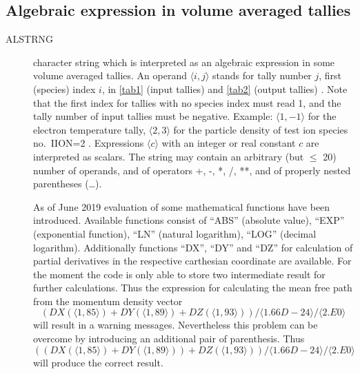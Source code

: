 \subsection{Algebraic expression in volume averaged tallies}\label{sec2.10C}

\begin{description}
  \item[ALSTRNG] character string which is interpreted as an
        algebraic expression in some volume averaged tallies.
        An operand $\langle i,j \rangle$ stands for tally number $j$, first (species)
        index $i$, in \cref{tab1} (input tallies) and \cref{tab2} (output tallies) .
        Note that the first index for tallies with no species index must read 1, and
        the tally number of input tallies must be negative.
        Example: $\langle 1,-1\rangle$ for the electron temperature tally, $\langle
          2,3\rangle$ for the particle density of test ion species no.\ IION=2 .
        Expressions $\langle c\rangle$ with an integer or real constant $c$ are
        interpreted as scalars.
        The string may contain an arbitrary (but $\le$ 20) number of operands, and of
        operators +, -, *, /, **, and of properly nested parentheses (\dots).

        As of June 2019 evaluation of some mathematical functions have been introduced.
        Available functions consist of ``ABS'' (absolute value), ``EXP'' (exponential
        function), ``LN'' (natural logarithm), ``LOG'' (decimal logarithm).
        Additionally functions ``DX'', ``DY'' and ``DZ'' for calculation of partial 
        derivatives in the respective carthesian coordinate are available. 
        For the moment the code is only able to store two intermediate result for 
        further calculations.
        Thus the expression for calculating the mean free path from the momentum 
        density vector 
        \begin{equation*}
          (DX( \langle 1,85 \rangle) + DY(\langle 1,89 \rangle) + DZ(\langle 1,93 
          \rangle)) / \langle 1.66D-24 \rangle / \langle 2.E0 \rangle
        \end{equation*}
        will result in a warning messages. 
        Nevertheless this problem can be overcome by introducing an additional pair of 
        parenthesis. 
        Thus
        \begin{equation*}
          ((DX( \langle 1,85 \rangle) + DY(\langle 1,89 \rangle)) + DZ(\langle 1,93
          \rangle)) / \langle 1.66D-24 \rangle / \langle 2.E0 \rangle
        \end{equation*}
        will produce the correct result.


\end{description}
